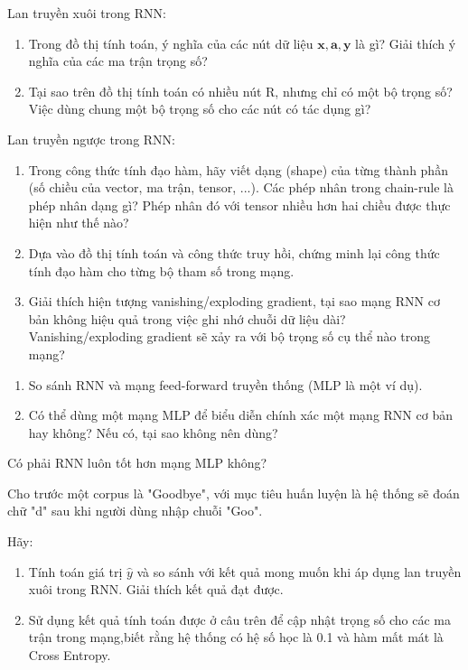 \clearpage
\begin{exer}
Lan truyền xuôi trong RNN:
    \begin{enumerate}[label=\alph*)]
    \item Trong đồ thị tính toán, ý nghĩa của các nút dữ liệu $\symbf x, \symbf a, \symbf y$ là gì? Giải thích ý nghĩa của các ma trận trọng số?
    \item Tại sao trên đồ thị tính toán có nhiều nút R, nhưng chỉ có một bộ trọng số? Việc dùng chung một bộ trọng số cho các nút có tác dụng gì?
    \end{enumerate}
\end{exer}

\begin{exer}
Lan truyền ngược trong RNN:
    \begin{enumerate}[label=\alph*)]
    \item Trong công thức tính đạo hàm, hãy viết dạng (shape) của từng thành phần (số chiều của vector, ma trận, tensor, ...). Các phép nhân trong chain-rule là phép nhân dạng gì?
    Phép nhân đó với tensor nhiều hơn hai chiều được thực hiện như thế nào?
    \item Dựa vào đồ thị tính toán và công thức truy hồi, chứng minh lại công thức tính đạo hàm cho từng bộ tham số trong mạng.
    \item Giải thích hiện tượng vanishing/exploding gradient, tại sao mạng RNN cơ bản không hiệu quả trong việc ghi nhớ chuỗi dữ liệu dài? Vanishing/exploding gradient sẽ xảy ra với bộ trọng số cụ thể nào trong mạng?
    \end{enumerate}
\end{exer}

\begin{exer}
\leavevmode
    \begin{enumerate}[label=\alph*)]
    \item So sánh RNN và mạng feed-forward truyền thống (MLP là một ví dụ).
    \item Có thể dùng một mạng MLP để biểu diễn chính xác một mạng RNN cơ bản hay không? Nếu có, tại sao không nên dùng?
    \end{enumerate}
\end{exer}

\begin{exer}
Có phải RNN luôn tốt hơn mạng MLP không?
\end{exer}

\clearpage
\begin{exer}
Cho trước một corpus là "Goodbye", với mục tiêu huấn luyện là hệ thống sẽ đoán chữ "d" sau khi người dùng nhập chuỗi "Goo".

Hãy:
    \begin{enumerate}[label=\alph*)]
    \item Tính toán giá trị $\widehat{y}$ và so sánh với kết quả mong muốn khi áp dụng lan truyền xuôi trong RNN. Giải thích kết quả đạt được.
    \item Sử dụng kết quả tính toán được ở câu trên để cập nhật trọng số cho các ma trận trong mạng,biết rằng hệ thống có hệ số học là 0.1 và hàm mất mát là Cross Entropy.
    \end{enumerate}
\end{exer}